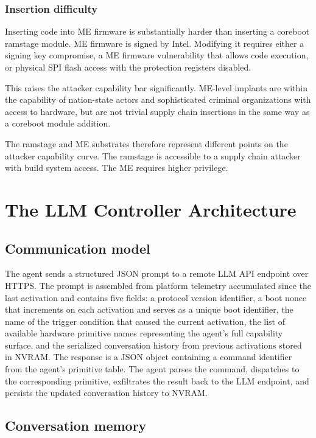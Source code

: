 \documentclass[11pt,a4paper]{article}
\begin{document}
\subsubsection{Insertion difficulty}

Inserting code into ME firmware is substantially harder than inserting a coreboot ramstage module. ME firmware is signed by Intel. Modifying it requires either a signing key compromise, a ME firmware vulnerability that allows code execution, or physical SPI flash access with the protection registers disabled.

This raises the attacker capability bar significantly. ME-level implants are within the capability of nation-state actors and sophisticated criminal organizations with access to hardware, but are not trivial supply chain insertions in the same way as a coreboot module addition.

The ramstage and ME substrates therefore represent different points on the attacker capability curve. The ramstage is accessible to a supply chain attacker with build system access. The ME requires higher privilege.

\section{The LLM Controller Architecture}

\subsection{Communication model}

The agent sends a structured JSON prompt to a remote LLM API endpoint over HTTPS. The prompt is assembled from platform telemetry accumulated since the last activation and contains five fields: a protocol version identifier, a boot nonce that increments on each activation and serves as a unique boot identifier, the name of the trigger condition that caused the current activation, the list of available hardware primitive names representing the agent's full capability surface, and the serialized conversation history from previous activations stored in NVRAM. The response is a JSON object containing a command identifier from the agent's primitive table. The agent parses the command, dispatches to the corresponding primitive, exfiltrates the result back to the LLM endpoint, and persists the updated conversation history to NVRAM.

\subsection{Conversation memory}
\end{document}
